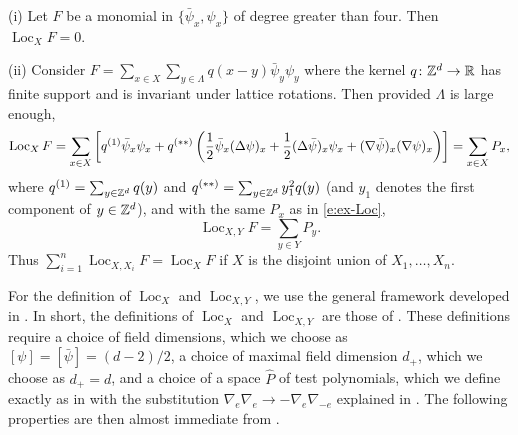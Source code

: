 \documentclass[11pt]{amsart}
\numberwithin{equation}{section}
\numberwithin{theorem}{section}
\newcommand{\1}{{\bf 1}}
\newcommand{\Loc}{\operatorname{Loc}}
\begin{document}
\begin{example}
  (i) Let $F$ be a monomial in $\{\bar\psi_x, \psi_x\}$ of degree greater than four. Then $\Loc_X F = 0$.

  \smallskip
  \noindent
  (ii) Consider $F= \sum_{x\in X}\sum_{y\in\Lambda}
  q(x-y)\bar\psi_y\psi_y$ where the kernel $q\colon \mathbb{Z}^d \to \mathbb{R}$ has
  finite support and is invariant under lattice rotations. Then 
  provided $\Lambda$ is large enough,
  \begin{equation} \label{e:ex-Loc}
    \Loc_X F = \sum_{x\in X} \qa{ q^{(1)} \bar\psi_x\psi_x +
      q^{(**)}\pa{\frac12 \bar\psi_x(\Delta\psi)_x + \frac12
        (\Delta\bar\psi)_x\psi_x + (\nabla\bar\psi)_{x}(\nabla\psi)_{x}} } = \sum_{x\in X} P_x,
  \end{equation}
  where $q^{(1)}= \sum_{y \in\mathbb{Z}^d} q(y)$ and
  $q^{(**)} = \sum_{y \in\mathbb{Z}^d} y_1^2 q(y)$ (and $y_1$ denotes the
  first component of $y\in\mathbb{Z}^d$), and with the same $P_x$ as in
  \eqref{e:ex-Loc},
  \begin{equation}
    \Loc_{X,Y} F = \sum_{y\in Y} P_y.
  \end{equation}
  Thus $\sum_{i=1}^n \Loc_{X,X_i} F =\Loc_X F$ if $X$ is the disjoint union of $X_1,\dots, X_n$.
\end{example}

For the definition of $\Loc_X$ and $\Loc_{X,Y}$, we use the
general framework developed in \cite{MR3332939}.  In short, the
definitions of $\Loc_X$ and $\Loc_{X,Y}$ are those of
\cite[Definition~1.6 and~1.15]{MR3332939}.  These definitions require
a choice of field dimensions, which we choose as
$[\psi]=[\bar\psi] = (d-2)/2$, a choice of maximal field dimension
$d_+$, which we choose as $d_{+}=d$, and a choice of a space $\hat P$
of test polynomials, which we define exactly as in
\cite[(1.19)]{MR3332939} with the substitution
$\nabla_e\nabla_e\to -\nabla_e\nabla_{-e}$ explained in
\cite[Example~1.3]{MR3332939}.  The following properties are then
almost immediate from \cite{MR3332939}.
\end{document}
